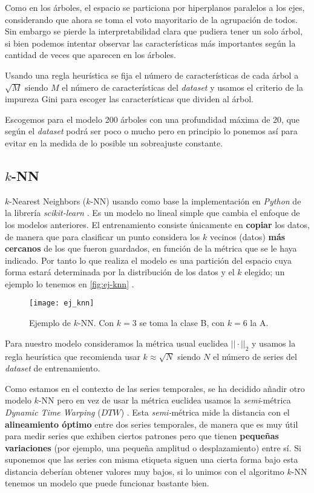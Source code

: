 Como en los árboles, el espacio se particiona por hiperplanos paralelos a los ejes, considerando que ahora se toma el voto mayoritario de la agrupación de todos. Sin embargo se pierde la interpretabilidad clara que pudiera tener un solo árbol, si bien podemos intentar observar las características más importantes según la cantidad de veces que aparecen en los árboles.

Usando una regla heurística se fija el número de características de cada árbol a $\sqrt{M}$ siendo $M$ el número de características del \emph{dataset} y usamos el criterio de la impureza Gini \cite{rokach2005top} para escoger las características que dividen al árbol.

Escogemos para el modelo 200 árboles con una profundidad máxima de 20, que según el \emph{dataset} podrá ser poco o mucho pero en principio lo ponemos así para evitar en la medida de lo posible un sobreajuste constante.

\subsection{$k$-NN}

$k$-Nearest Neighbors ($k$-NN) \cite{cover1967nearest} usando como base la implementación en \emph{Python} de la librería \emph{scikit-learn} \cite{scikit2020knn}. Es un modelo no lineal simple que cambia el enfoque de los modelos anteriores. El entrenamiento consiste únicamente en \textbf{copiar} los datos, de manera que para clasificar un punto considera los $k$ vecinos (datos) \textbf{más cercanos} de los que fueron guardados, en función de la métrica que se le haya indicado. Por tanto lo que realiza el modelo es una partición del espacio cuya forma estará determinada por la distribución de los datos y el $k$ elegido; un ejemplo lo tenemos en \autoref{fig:ej-knn} \cite{sanjay2018knn}.

\begin{figure}[htbp]
  \centering
  \texttt{[image: ej\_knn]}
  \caption{Ejemplo de $k$-NN. Con $k=3$ se toma la clase B, con $k=6$ la A.}
  \label{fig:ej-knn}
\end{figure}

Para nuestro modelo consideramos la métrica usual euclidea $||\cdot||_2$ y usamos la regla heurística que recomienda usar $k \approx \sqrt{N}$ siendo $N$ el número de series del \emph{dataset} de entrenamiento.

Como estamos en el contexto de las series temporales, se ha decidido añadir otro modelo $k$-NN pero en vez de usar la métrica euclidea usamos la \emph{semi}-métrica \emph{Dynamic Time Warping} ($DTW$) \cite{berndt1994using}. Esta \emph{semi-}métrica \cite{jain2018semi} mide la distancia con el \textbf{alineamiento óptimo} entre dos series temporales, de manera que es muy útil para medir series que exhiben ciertos patrones pero que tienen \textbf{pequeñas variaciones} (por ejemplo, una pequeña amplitud o desplazamiento) entre sí. Si suponemos que las series con misma etiqueta siguen una cierta forma bajo esta distancia deberían obtener valores muy bajos, si lo unimos con el algoritmo $k$-NN tenemos un modelo que puede funcionar bastante bien.

